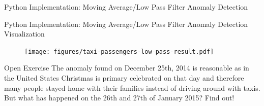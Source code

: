 \documentclass[document.tex]{subfiles}
\begin{document}
    \begin{frame}{Python Implementation: Moving Average/Low Pass Filter Anomaly Detection}
        
    \end{frame}

    \begin{frame}{Python Implementation: Moving Average/Low Pass Filter Anomaly Detection Visualization}
        \begin{figure}
            \label{fig:taxi-passengers-low-pass-result}
            \texttt{[image: figures/taxi-passengers-low-pass-result.pdf]}
        \end{figure}
    \end{frame}

    \begin{frame}{Open Exercise }
        The anomaly found on December 25th, 2014 is reasonable as in the United States Christmas is primary celebrated on that day and therefore many people stayed home with their families instead of driving around with taxis. But what has happened on the 26th and 27th of January 2015? Find out!
        

\end{frame}
\end{document}
